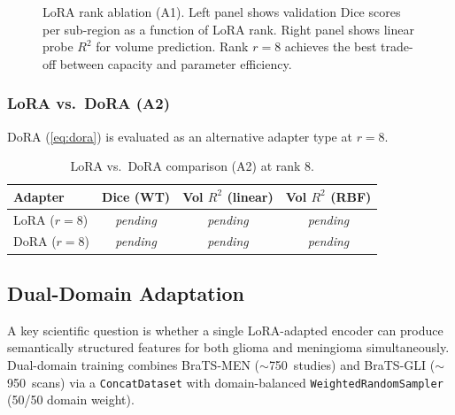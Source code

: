 \begin{figure}[H]
  \centering
  \caption{LoRA rank ablation (A1). Left panel shows validation Dice scores
    per sub-region as a function of LoRA rank. Right panel shows linear probe
    $R^2$ for volume prediction. Rank $r=8$ achieves the best trade-off
    between capacity and parameter efficiency.}
  \label{fig:rank_ablation}
\end{figure}

\subsubsection{LoRA vs.\ DoRA (A2)}

DoRA (\cref{eq:dora}) is evaluated as an alternative adapter type at $r=8$.

\begin{table}[H]
  \centering
  \caption{LoRA vs.\ DoRA comparison (A2) at rank 8.}
  \label{tab:lora_vs_dora}
  \begin{tabular}{lccc}
    \toprule
    \textbf{Adapter} & \textbf{Dice (WT)} & \textbf{Vol $R^2$ (linear)} & \textbf{Vol $R^2$ (RBF)} \\
    \midrule
    LoRA ($r=8$) & \textit{pending} & \textit{pending} & \textit{pending} \\
    DoRA ($r=8$) & \textit{pending} & \textit{pending} & \textit{pending} \\
    \bottomrule
  \end{tabular}
\end{table}

\subsection{Dual-Domain Adaptation}
\label{sec:lora:dual}

A key scientific question is whether a single LoRA-adapted encoder can produce
semantically structured features for both glioma and meningioma simultaneously.
Dual-domain training combines BraTS-MEN ($\sim$750~studies) and BraTS-GLI
($\sim$950~scans) via a \texttt{ConcatDataset} with domain-balanced
\texttt{WeightedRandomSampler} (50/50 domain weight).

